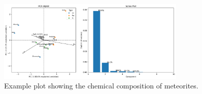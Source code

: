 
\begin{figure}[htbp]
    \centering
    \includegraphics[width=0.8\textwidth]{figures/pca_biplot.png}
    \caption{Example plot showing the chemical composition of meteorites.}
    \label{fig:myplot}
\end{figure}
